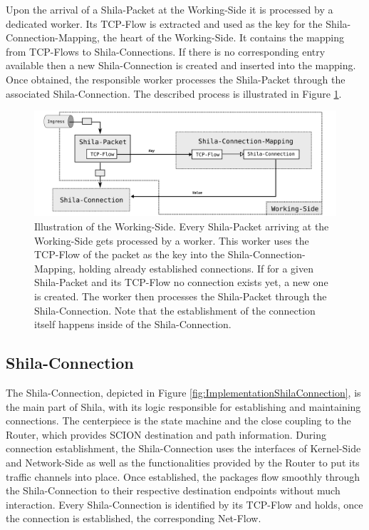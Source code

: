 Upon the arrival of a Shila-Packet at the Working-Side it is processed by a dedicated worker. Its TCP-Flow is extracted and used as the key for the Shila-Connection-Mapping, the heart of the Working-Side. It contains the mapping from TCP-Flows to Shila-Connections. If there is no corresponding entry available then a new Shila-Connection is created and inserted into the mapping. Once obtained, the responsible worker processes the Shila-Packet through the associated Shila-Connection. The described process is illustrated in Figure \ref{fig:ImplementationProcessWorkingSide}. 

\begin{figure}
	\begin{center}
		\def\svgwidth{1\textwidth}
		\includegraphics[scale=0.2]{../illustrations/implementation/ProcessWorkingSide.pdf}   
		\caption[]{Illustration of the Working-Side. Every Shila-Packet arriving at the Working-Side gets processed by a worker. This worker uses the TCP-Flow of the packet as the key into the Shila-Connection-Mapping, holding already established connections. If for a given Shila-Packet and its TCP-Flow no connection exists yet, a new one is created. The worker then processes the Shila-Packet through the Shila-Connection. Note that the establishment of the connection itself happens inside of the Shila-Connection.}
		\label{fig:ImplementationProcessWorkingSide}
	\end{center}
\end{figure}

\subsection*{Shila-Connection}

The Shila-Connection, depicted in Figure \ref{fig:ImplementationShilaConnection}, is the main part of Shila, with its logic responsible for establishing and maintaining connections. The centerpiece is the state machine and the close coupling to the Router, which provides SCION destination and path information. During connection establishment, the Shila-Connection uses the interfaces of Kernel-Side and Network-Side as well as the functionalities provided by the Router to put its traffic channels into place. Once established, the packages flow smoothly through the Shila-Connection to their respective destination endpoints without much interaction. Every Shila-Connection is identified by its TCP-Flow and holds, once the connection is established, the corresponding Net-Flow.


